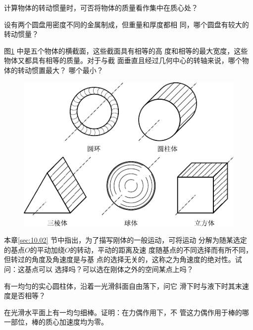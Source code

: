 \begin{questions}

\question 计算物体的转动惯量时，可否将物体的质量看作集中在质心处？

\question 设有两个圆盘用密度不同的金属制成，但重量和厚度都相
同，哪个圆盘有较大的转动惯量？

\question 图\ref{fig:10.24} 中是五个物体的横截面，这些截面具有相等的高
度和相等的最大宽度，这些物体又都具有相等的质量。对于与截
面垂直且经过几何中心的转轴来说，哪个物体的转动惯置最大？
哪个最小？

\vspace{1.5em}
\begin{figure}[h]
    \centering
    \includegraphics{figure/fig10.24}
    \caption{}
    \label{fig:10.24}
\end{figure}

\question 本章\ref{sec:10.02} 节中指出，为了描写刚体的一般运动，可将运动
分解为随某选定的基点$ O $的平动加绕$ O $的转动，平动的距离及速
度随基点的不同选择而有所不同，但转过的角度及角速度是与基
点的选择无关的，这称之为角速度的绝对性。试问：这基点可以
选择吗？可以选在刚体之外的空间某点上吗？

\question 有一均匀的实心圆柱体，沿着一光滑斜面自由落下，问它
滑下时与液下时其末速度是否相等？

\question 在光滑水平面上有一均匀细棒。证明：在力偶作用下，不
管这力偶作用于棒的哪一部位，棒的质心加速度均为零。

\end{questions}
